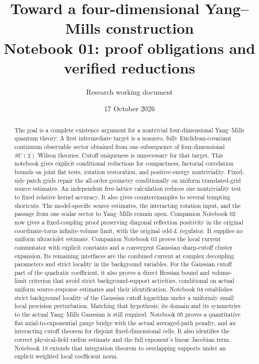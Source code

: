 \documentclass[11pt]{article}
\title{Toward a four-dimensional Yang--Mills construction\\
\large Notebook 01: proof obligations and verified reductions}
\author{Research working document}
\date{17 October 2026}
\theoremstyle{remark}
\begin{document}
\maketitle

\begin{abstract}
The goal is a complete existence argument for a nontrivial
four-dimensional Yang--Mills quantum theory. A first intermediate
target is a nonzero, fully Euclidean-covariant continuum observable
sector obtained from one subsequence of four-dimensional $SU(2)$
Wilson theories. Cutoff uniqueness is unnecessary for that target.
This notebook gives explicit conditional reductions for compactness, factorial
correlation bounds on joint flat tests, rotation restoration, and
positive-energy nontriviality. Fixed-side patch grids repair the all-order
geometry conditionally on uniform translated-grid source estimates.
An independent free-lattice calculation reduces one nontriviality test
to fixed relative kernel accuracy.
It also gives counterexamples to several tempting shortcuts.
The model-specific source estimates, the interacting rotation input, and
the passage from one scalar sector to Yang--Mills remain open.
Companion Notebook 02 now gives a fixed-coupling proof preserving diagonal
reflection positivity in the original coordinate-torus infinite-volume
limit, with the original odd-$L$ regulator. It supplies no uniform
ultraviolet estimate.
Companion Notebook 03 proves the local current commutator with explicit
constants and a convergent Gaussian sharp-cutoff cluster expansion.
Its remaining interfaces are the combined current at complex decoupling
parameters and strict locality in the background variables.
For the Gaussian cutoff part of the quadratic coefficient, it also
proves a direct Hessian bound and volume-limit criterion that avoid
strict background-support activities, conditional on actual uniform
source-response estimates and their identification.
Notebook 04 establishes strict background locality of the Gaussian
cutoff logarithm under a uniformly small local precision perturbation.
Matching that hypothesis, its domain and its symmetries to the actual
Yang--Mills Gaussian is still required.
Notebook 05 proves a quantitative flat axial-to-exponential gauge bridge
with the actual averaged-path penalty, and an interacting cutoff theorem
for disjoint fixed-dimensional cells. It also identifies the correct
physical-field radius estimate and the full exponent's linear Jacobian
term. Notebook 18 extends that integration theorem to overlapping
supports under an explicit weighted local coefficient norm.

\end{abstract}
\end{document}
